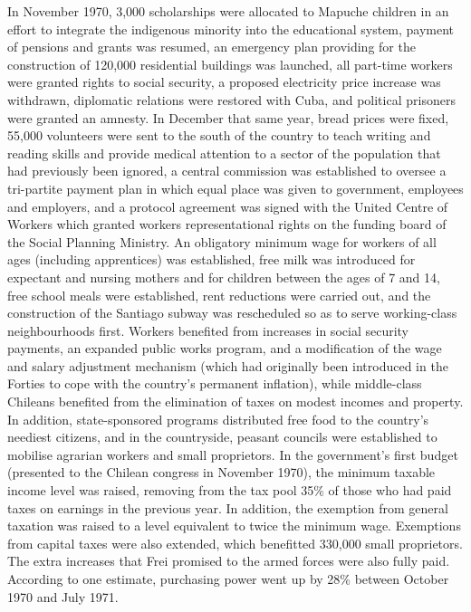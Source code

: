 In November 1970, 3,000 scholarships were allocated to Mapuche children
in an effort to integrate the indigenous minority into the educational
system, payment of pensions and grants was resumed, an emergency plan
providing for the construction of 120,000 residential buildings was
launched, all part-time workers were granted rights to social security,
a proposed electricity price increase was withdrawn, diplomatic
relations were restored with Cuba, and political prisoners were granted
an amnesty. In December that same year, bread prices were fixed, 55,000
volunteers were sent to the south of the country to teach writing and
reading skills and provide medical attention to a sector of the
population that had previously been ignored, a central commission was
established to oversee a tri-partite payment plan in which equal place
was given to government, employees and employers, and a protocol
agreement was signed with the United Centre of Workers which granted
workers representational rights on the funding board of the Social
Planning Ministry. An obligatory minimum wage for workers of all ages
(including apprentices) was established, free milk was introduced for
expectant and nursing mothers and for children between the ages of 7 and
14, free school meals were established, rent reductions were carried
out, and the construction of the Santiago subway was rescheduled so as
to serve working-class neighbourhoods first. Workers benefited from
increases in social security payments, an expanded public works program,
and a modification of the wage and salary adjustment mechanism (which
had originally been introduced in the Forties to cope with the country's
permanent inflation), while middle-class Chileans benefited from the
elimination of taxes on modest incomes and property. In addition,
state-sponsored programs distributed free food to the country's neediest
citizens, and in the countryside, peasant councils were established to
mobilise agrarian workers and small proprietors. In the government's
first budget (presented to the Chilean congress in November 1970), the
minimum taxable income level was raised, removing from the tax pool 35\%
of those who had paid taxes on earnings in the previous year. In
addition, the exemption from general taxation was raised to a level
equivalent to twice the minimum wage. Exemptions from capital taxes were
also extended, which benefitted 330,000 small proprietors. The extra
increases that Frei promised to the armed forces were also fully paid.
According to one estimate, purchasing power went up by 28\% between
October 1970 and July 1971.

